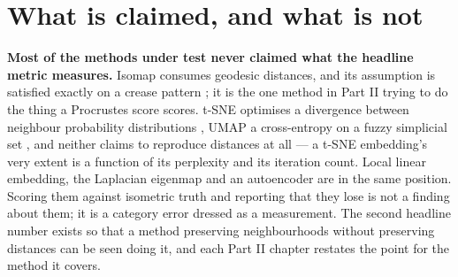 \documentclass[
  british,
  a4paper,
]{book}
\begin{document}
\section{What is claimed, and what is not}\label{intro-limits}

\textbf{Most of the methods under test never claimed what the headline metric
measures.} Isomap consumes geodesic distances, and its assumption is satisfied
exactly on a crease pattern \citep{tenenbaum2000isomap}; it is the one method in Part
II trying to do the thing a Procrustes score scores. t-SNE optimises a
divergence between neighbour probability distributions \citep{vandermaaten2008tsne},
UMAP a cross-entropy on a fuzzy simplicial set \citep{mcinnes2018umap}, and neither
claims to reproduce distances at all --- a t-SNE embedding's very extent is a
function of its perplexity and its iteration count. Local linear embedding, the
Laplacian eigenmap and an autoencoder are in the same position. Scoring them
against isometric truth and reporting that they lose is not a finding about
them; it is a category error dressed as a measurement. The second headline
number exists so that a method preserving neighbourhoods without preserving
distances can be seen doing it, and each Part II chapter restates the point for
the method it covers.
\end{document}
